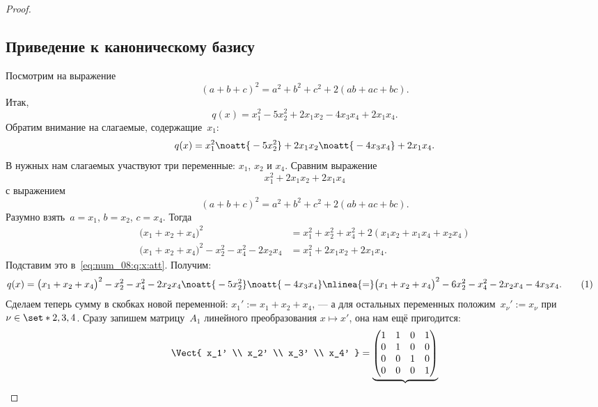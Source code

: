 \begin{proof}
	\subsection{Приведение к каноническому базису}
	Посмотрим на выражение
	\[
		(a + b + c)^2 =
		a^2 + b^2 + c^2
		+
		2(ab + ac + bc)
		.
	\]
	Итак,
	\[
		q(x) =
		x_1^2 - 5x_2^2 + 2x_1 x_2 - 4x_3 x_4 + 2x_1 x_4
		.
	\]
	Обратим внимание на слагаемые, содержащие~$x_1$:
	\begin{equation}
		\label{eq:num_08:q:x:att}
		q(x) =
		x_1^2
		\noatt{{}- 5x_2^2}
		+ 2x_1 x_2
		\noatt{{}- 4x_3 x_4}
		+ 2x_1 x_4
		.
	\end{equation}
	В нужных нам слагаемых участвуют три переменные: $x_1$, $x_2$ и $x_4$.
	Сравним выражение
	\[
		x_1^2 + 2x_1 x_2 + 2x_1 x_4
	\]
	с выражением
	\[
		(a + b + c)^2 =
		a^2 + b^2 + c^2
		+
		2(ab + ac + bc)
		.
	\]
	Разумно взять~$a = x_1$, $b = x_2$, $c = x_4$. Тогда
	\begin{align*}
		\bigl(
			x_1 + x_2 + x_4
		\bigr)^2
		&=
		x_1^2 + x_2^2 + x_4^2
		+
		2(x_1 x_2 + x_1 x_4 + x_2 x_4)
		\\
		\bigl(
			x_1 + x_2 + x_4
		\bigr)^2
		-
		x_2^2
		-
		x_4^2
		-
		2x_2 x_4
		&=
		x_1^2 + 2x_1 x_2 + 2x_1 x_4
		.
	\end{align*}
	Подставим это в~\eqref{eq:num_08:q:x:att}. Получим:
	\begin{align*}
		q(x) &=
		\bigl(
			x_1 + x_2 + x_4
		\bigr)^2
		-
		x_2^2
		-
		x_4^2
		-
		2x_2 x_4
		\noatt{{}- 5x_2^2}
		\noatt{{}- 4x_3 x_4}
		\nlinea{=}
		\bigl(
			x_1 + x_2 + x_4
		\bigr)^2
		-
		6x_2^2
		-
		x_4^2
		-
		2x_2 x_4
		-
		4x_3 x_4
		.
		\refstepcounter{equation}
		\tag{\theequation}
		\label{eq:num_08:q:x:pre}
	\end{align*}
	Сделаем теперь сумму в скобках новой переменной: $x_1' := x_1 + x_2 + x_4$, --- а для остальных переменных положим~$x_\nu' := x_\nu$ при $\nu \in \set*{2, 3, 4}$.
	Сразу запишем матрицу~$A_1$ линейного преобразования $x \mapsto x'$, она нам ещё пригодится:
	\begin{align*}
		\Vect{
			x_1' \\ x_2' \\ x_3' \\ x_4'
		}
		=
		\underbrace{
			\begin{pmatrix}
				1 & 1 & 0 & 1
				\\
				0 & 1 & 0 & 0
				\\
				0 & 0 & 1 & 0
				\\
				0 & 0 & 0 & 1
			\end{pmatrix}
}
\end{align*}
\end{proof}
